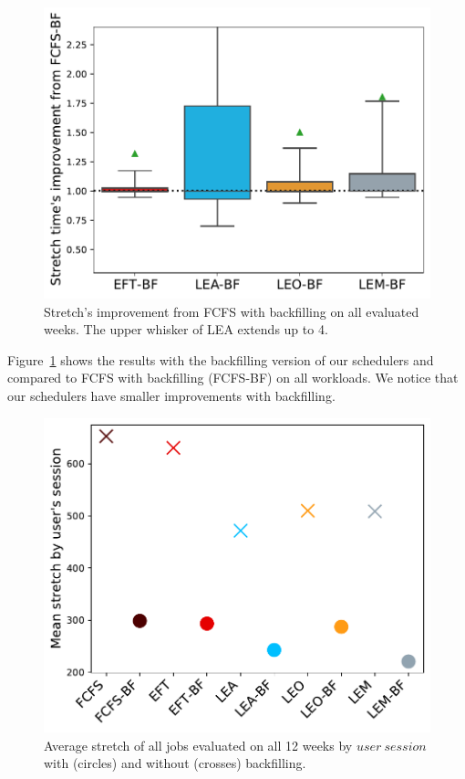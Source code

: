 \documentclass[sigconf,review,anonymous]{acmart}
\newcommand{\rev}[1]{{\color{blue}{#1}}}
\newcommand{\us}{\ensuremath{\mathit{user~session}}\xspace}
\begin{document}
\paragraph{\rev{Results with backfilling}}
\begin{figure}[t]\centering\includegraphics[width=0.9\linewidth]{../MBSS/plot/Boxplot/byuser/box_plot_bf_stretch_all-all_1.pdf}\caption{Stretch's improvement from FCFS with backfilling on all evaluated weeks. The upper whisker of LEA extends up to 4.}\label{boxplot.all_bf}\end{figure}
Figure~\ref{boxplot.all_bf} shows the results with the backfilling version of our
schedulers and compared to FCFS with backfilling (FCFS-BF) on all workloads.
We notice that our schedulers have smaller improvements with backfilling.
\begin{figure}[t]\centering\includegraphics[width=0.9\linewidth]{../MBSS/plot/byuser/Mean_stretch_with_and_without_bf_all-all.pdf}\caption{Average stretch of all jobs evaluated on all 12 weeks by \us with (circles) and without (crosses) backfilling.}\label{bf_vs_non_bf}\end{figure}
\end{document}
